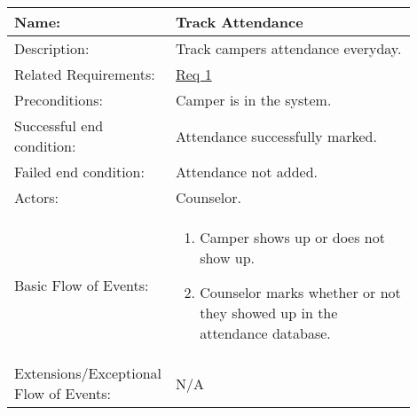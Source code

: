 \documentclass[11pt]{article}
\begin{document}

\begin{table}[!htb]
\begin{center}
\begin{tabular}{p{0.30\linewidth}p{0.60\linewidth}}
	Name: & Track Attendance\\\hline
	Description: & Track campers attendance everyday.\\\hline
	Related Requirements:& \hyperlink{Req1}{Req 1}\\\hline
	Preconditions:& Camper is in the system.\\\hline
	Successful end condition:& Attendance successfully marked. \\\hline
	Failed end condition:& Attendance not added.\\\hline
	Actors:& Counselor. \\\hline
	Basic Flow of Events: & \begin{enumerate}[topsep=0pt]
		\item Camper shows up or does not show up.
		\item Counselor marks whether or not they showed up in the attendance database.
	\end{enumerate}\\\hline
	Extensions/Exceptional Flow of Events: & \vspace*{.25em}  N/A
\end{tabular}
\label{des:track attendance}	
\end{center}
\end{table}
\end{document}
